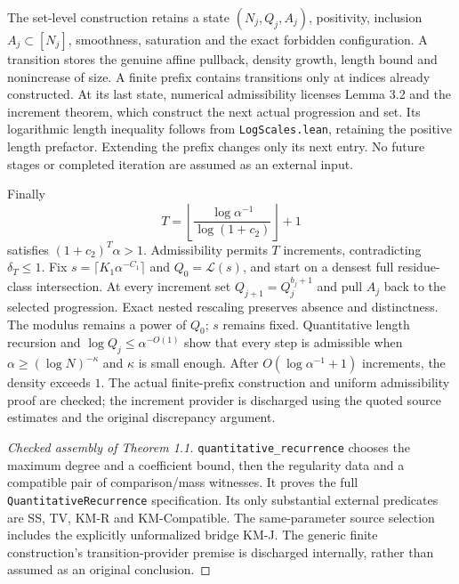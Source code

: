 The set-level construction retains a state $(N_j,Q_j,A_j)$, positivity, inclusion $A_j\subset[N_j]$, smoothness, saturation and the exact forbidden configuration. A transition stores the genuine affine pullback, density growth, length bound and nonincrease of size. A finite prefix contains transitions only at indices already constructed. At its last state, numerical admissibility licenses Lemma 3.2 and the increment theorem, which construct the next actual progression and set. Its logarithmic length inequality follows from \texttt{LogScales.lean}, retaining the positive length prefactor. Extending the prefix changes only its next entry. No future stages or completed iteration are assumed as an external input.

Finally
\[
 T=\left\lfloor\frac{\log\alpha^{-1}}{\log(1+c_2)}\right\rfloor+1
\]
satisfies $(1+c_2)^T\alpha>1$. Admissibility permits $T$ increments, contradicting $\delta_T\leq1$.
\else
Fix $s=\lceil K_1\alpha^{-C_1}\rceil$ and $Q_0=\mathcal L(s)$, and start on a densest full residue-class intersection. At every increment set $Q_{j+1}=Q_j^{b_j+1}$ and pull $A_j$ back to the selected progression. Exact nested rescaling preserves absence and distinctness. The modulus remains a power of $Q_0$; $s$ remains fixed. Quantitative length recursion and $\log Q_j\leq\alpha^{-O(1)}$ show that every step is admissible when $\alpha\geq(\log N)^{-\kappa}$ and $\kappa$ is small enough. After $O(\log\alpha^{-1}+1)$ increments, the density exceeds $1$. The actual finite-prefix construction and uniform admissibility proof are checked; the increment provider is discharged using the quoted source estimates and the original discrepancy argument.
\fi
\begin{proof}[Checked assembly of Theorem 1.1]
\leanok
\texttt{quantitative\_\allowbreak{}recurrence} chooses the maximum degree and a coefficient bound, then the regularity data and a compatible pair of comparison/mass witnesses. It proves the full \texttt{QuantitativeRecurrence} specification. Its only substantial external predicates are SS, TV, KM-R and KM-Compatible. The same-parameter source selection includes the explicitly unformalized bridge KM-J. The generic finite construction's transition-provider premise is discharged internally, rather than assumed as an original conclusion.
\end{proof}


